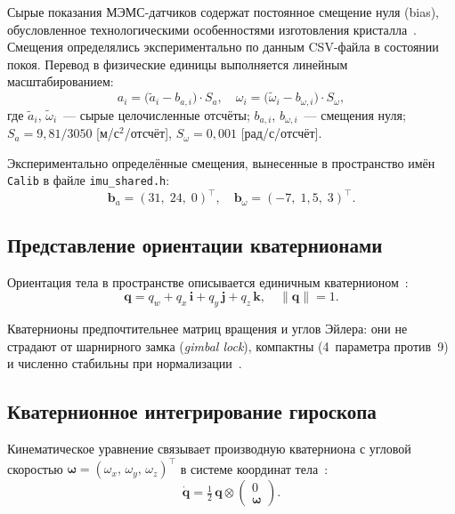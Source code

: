 Сырые показания МЭМС-датчиков содержат постоянное смещение нуля (bias),
обусловленное технологическими особенностями изготовления
кристалла~\cite{titterton2004}. Смещения определялись экспериментально по
данным CSV-файла в состоянии покоя. Перевод в физические единицы выполняется
линейным масштабированием:
\begin{equation}
    a_i = \bigl(\tilde{a}_i - b_{a,i}\bigr) \cdot S_a, \quad
    \omega_i = \bigl(\tilde{\omega}_i - b_{\omega,i}\bigr) \cdot S_\omega,
    \label{eq:calib}
\end{equation}
где $\tilde{a}_i$, $\tilde{\omega}_i$~--- сырые целочисленные отсчёты;
$b_{a,i}$, $b_{\omega,i}$~--- смещения нуля;
$S_a = 9{,}81/3050$ [м/с$^2$/отсчёт],
$S_\omega = 0{,}001$ [рад/с/отсчёт].
 
Экспериментально определённые смещения, вынесенные в пространство имён
\texttt{Calib} в файле \texttt{imu\_shared.h}:
\begin{equation}
    \mathbf{b}_a = (31,\; 24,\; 0)^\top, \quad
    \mathbf{b}_\omega = (-7,\; 1{,}5,\; 3)^\top.
    \label{eq:biases}
\end{equation}
 
\subsection{Представление ориентации кватернионами}
 
Ориентация тела в пространстве описывается единичным
кватернионом~\cite{kuipers1999}:
\begin{equation}
    \mathbf{q} = q_w + q_x\,\mathbf{i} + q_y\,\mathbf{j} + q_z\,\mathbf{k},
    \quad \|\mathbf{q}\| = 1.
    \label{eq:quat}
\end{equation}
 
Кватернионы предпочтительнее матриц вращения и углов Эйлера: они не страдают
от шарнирного замка (\textit{gimbal lock}), компактны (4~параметра против~9)
и численно стабильны при нормализации~\cite{kuipers1999}.
 
\subsection{Кватернионное интегрирование гироскопа}
 
Кинематическое уравнение связывает производную кватерниона с угловой скоростью
$\bm{\omega} = (\omega_x,\,\omega_y,\,\omega_z)^\top$ в системе координат
тела~\cite{mahony2008}:
\begin{equation}
    \dot{\mathbf{q}} = \tfrac{1}{2}\,\mathbf{q} \otimes
    \begin{pmatrix} 0 \\ \bm{\omega} \end{pmatrix}.
    \label{eq:qdot}
\end{equation}
 
